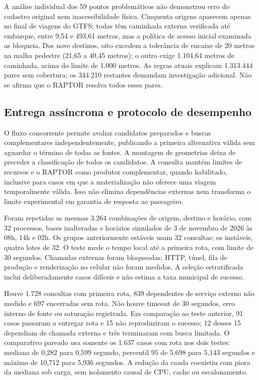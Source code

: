 A análise individual dos 59 pontos problemáticos não demonstrou erro do cadastro original nem inacessibilidade física. Cinquenta origens aparecem apenas no final de viagens do GTFS; todas têm caminhada externa verificada até embarque, entre 9,54 e 493,61 metros, mas a política de acesso inicial examinada as bloqueia. Dos nove destinos, oito excedem a tolerância de encaixe de 20 metros na malha pedestre (21,65 a 40,45 metros); o outro exige 1.104,64 metros de caminhada, acima do limite de 1.000 metros. As regras atuais explicam 1.313.444 pares sem cobertura; os 344.210 restantes demandam investigação adicional. Não se afirma que o RAPTOR resolva todos esses pares.

\subsection{Entrega assíncrona e protocolo de desempenho}
O fluxo concorrente permite avaliar candidatos preparados e buscas complementares independentemente, publicando a primeira alternativa válida sem aguardar o término de todas as fontes. A montagem de geometrias deixa de preceder a classificação de todos os candidatos. A consulta mantém limites de recursos e o RAPTOR como produtor complementar, quando habilitado, inclusive para casos em que a materialização não oferece uma viagem temporalmente válida. Isso não elimina dependências externas nem transforma o limite experimental em garantia de resposta ao passageiro.

Foram repetidas as mesmas 3.264 combinações de origem, destino e horário, com 32 processos, bases inalteradas e horários simulados de 3 de novembro de 2026 às 08h, 14h e 02h. Os grupos anteriormente estáveis usam 32 consultas; os instáveis, quatro lotes de 32. O teste mede o tempo local até a primeira rota, com limite de 30 segundos. Chamadas externas foram bloqueadas; HTTP, túnel, fila de produção e renderização no celular não foram medidos. A seleção estratificada inclui deliberadamente casos difíceis e não estima a taxa municipal de sucesso.

Houve 1.728 consultas com primeira rota, 839 dependentes de serviço externo não medido e 697 encerradas sem rota. Não houve timeout de 30 segundos, erro interno de fonte ou saturação registrada. Em comparação ao teste anterior, 91 casos passaram a entregar rota e 15 não reproduziram o sucesso; 12 desses 15 dependiam de chamada externa e três terminaram com busca limitada. O comparativo pareado usa somente os 1.637 casos com rota nos dois testes: mediana de 0,282 para 0,599 segundo, percentil 95 de 5,698 para 5,143 segundos e máximo de 10,712 para 5,936 segundos. A redução da cauda coexistiu com piora da mediana sob carga, sem isolamento causal de CPU, cache ou escalonamento.

